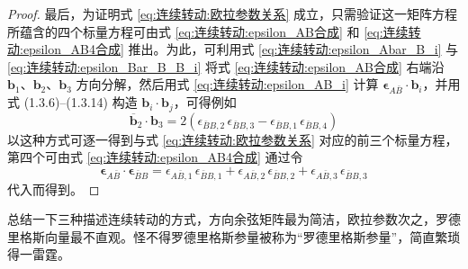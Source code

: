 \begin{proof}
最后，为证明式 \eqref{eq:连续转动:欧拉参数关系} 成立，只需验证这一矩阵方程所蕴含的四个标量方程可由式 \eqref{eq:连续转动:epsilon_AB合成} 和 \eqref{eq:连续转动:epsilon_AB4合成} 推出。为此，可利用式 \eqref{eq:连续转动:epsilon_Abar_B_i} 与 \eqref{eq:连续转动:epsilon_Bar_B_B_i} 将式 \eqref{eq:连续转动:epsilon_AB合成} 右端沿 $\mathbf{b}_1$、$\mathbf{b}_2$、$\mathbf{b}_3$ 方向分解，然后用式 \eqref{eq:连续转动:epsilon_AB_i} 计算 $\boldsymbol{\epsilon}_{A\bar B}\cdot\mathbf{b}_i$，并用式 (1.3.6)--(1.3.14) 构造 $\mathbf{b}_i\cdot\mathbf{b}_j$，可得例如
$$
\overline{\mathbf{b}}_2\cdot\mathbf{b}_3=2(\epsilon_{\bar B B,2}\,\epsilon_{\bar B B,3}-\epsilon_{\bar B B,1}\,\epsilon_{\bar B B,4})
$$
以这种方式可逐一得到与式 \eqref{eq:连续转动:欧拉参数关系} 对应的前三个标量方程，第四个可由式 \eqref{eq:连续转动:epsilon_AB4合成} 通过令
$$
\boldsymbol{\epsilon}_{A\bar B}\cdot\boldsymbol{\epsilon}_{\bar B B}=\epsilon_{A\bar B,1}\,\epsilon_{\bar B B,1}+\epsilon_{A\bar B,2}\,\epsilon_{\bar B B,2}+\epsilon_{A\bar B,3}\,\epsilon_{\bar B B,3}
$$
代入而得到。

\end{proof}

总结一下三种描述连续转动的方式，方向余弦矩阵最为简洁，欧拉参数次之，罗德里格斯向量最不直观。怪不得罗德里格斯参量被称为“罗德里格斯参量”，简直繁琐得一雷霆。

